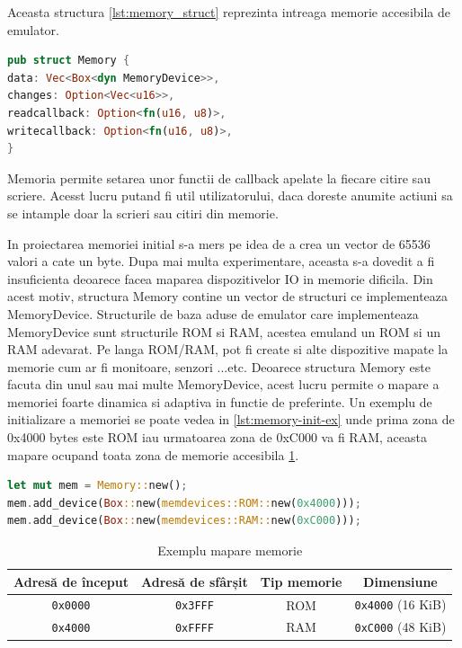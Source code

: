\documentclass[titlepage,12pt]{article}
\DeclareRobustCommand{\code}[1]{{\ttfamily\small #1}}
\begin{document}
Aceasta structura \cref{lst:memory_struct} reprezinta intreaga memorie accesibila de emulator.

\begin{lstlisting}[language=Rust,caption={Structura Memorie},label={lst:memory_struct}]
pub struct Memory {
data: Vec<Box<dyn MemoryDevice>>,
changes: Option<Vec<u16>>,
readcallback: Option<fn(u16, u8)>,
writecallback: Option<fn(u16, u8)>,
}
\end{lstlisting}

Memoria permite setarea unor functii de callback apelate la fiecare citire sau scriere. Acesst lucru putand fi util utilizatorului, daca doreste anumite actiuni sa se intample doar la scrieri sau citiri din memorie.

In proiectarea memoriei initial s-a mers pe idea de a crea un vector de 65536 valori a cate un byte. Dupa mai multa experimentare, aceasta s-a dovedit a fi insuficienta deoarece facea maparea dispozitivelor \code{IO} in memorie dificila. Din acest motiv, structura Memory contine un vector de structuri ce implementeaza \code{MemoryDevice}.
Structurile de baza aduse de emulator care implementeaza \code{MemoryDevice} sunt structurile \code{ROM} si \code{RAM}, acestea emuland un ROM si un RAM adevarat. Pe langa ROM/RAM, pot fi create si alte dispozitive mapate la memorie cum ar fi monitoare, senzori ...etc.
Deoarece structura \code{Memory} este facuta din unul sau mai multe \code{MemoryDevice}, acest lucru permite o mapare a memoriei foarte dinamica si adaptiva in functie de preferinte. Un exemplu de initializare a memoriei se poate vedea in \cref{lst:memory-init-ex} unde prima zona de 0x4000 bytes este ROM iau urmatoarea zona de 0xC000 va fi RAM, aceasta mapare ocupand toata zona de memorie accesibila \cref{tab:memory-mapping-ex}.
\begin{lstlisting}[language=Rust,caption={Exemplu initializare memorie},label={lst:memory-init-ex}]
let mut mem = Memory::new();
mem.add_device(Box::new(memdevices::ROM::new(0x4000)));
mem.add_device(Box::new(memdevices::RAM::new(0xC000)));
\end{lstlisting}

\begin{table}[H]
\centering
\begin{tabular}{|c|c|c|c|}
\hline
\textbf{Adresă de început} & \textbf{Adresă de sfârșit} & \textbf{Tip memorie} & \textbf{Dimensiune} \\
\hline
\texttt{0x0000} & \texttt{0x3FFF} & ROM & \texttt{0x4000} (16 KiB) \\
\hline
\texttt{0x4000} & \texttt{0xFFFF} & RAM & \texttt{0xC000} (48 KiB) \\
\hline
\end{tabular}
\caption{Exemplu mapare memorie}
\label{tab:memory-mapping-ex}
\end{table}
\end{document}
